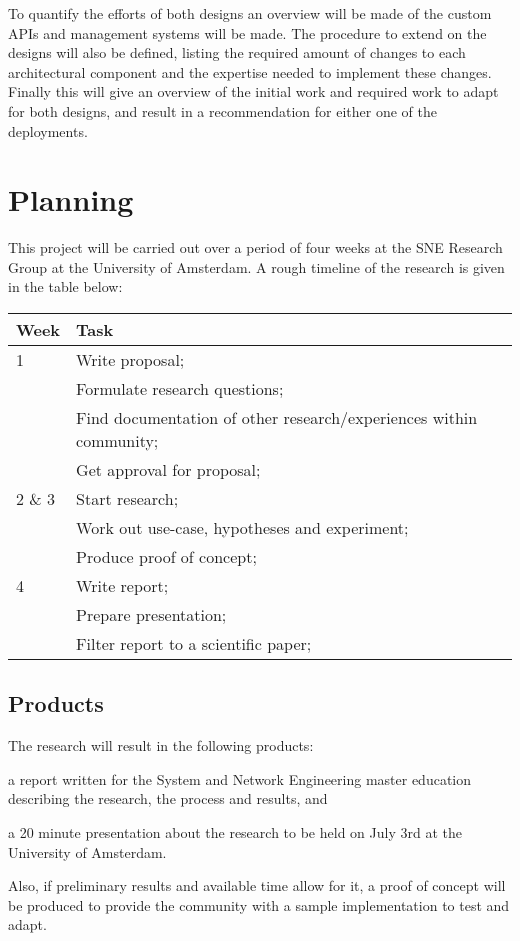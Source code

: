 \documentclass[oneside,twocolumn,8pt,a4paper]{article}
\begin{document}
		To quantify the efforts of both designs an overview will be made of the custom APIs and management systems will be made. The procedure to extend on the designs will also be defined, listing the required amount of changes to each architectural component and the expertise needed to implement these changes. Finally this will give an overview of the initial work and required work to adapt for both designs, and result in a recommendation for either one of the deployments.


	
	\section{Planning} %
	\label{sec:planning}
		This project will be carried out over a period of four weeks at the SNE Research Group at the University of Amsterdam. A rough timeline of the research is given in the table below: \\
		
		\begin{tabular}{l p{5.8cm}}
			Week & Task \\ \hline
				1 & Write proposal;\\
					& Formulate research questions; \\
					& Find documentation of other research/experiences within community; \\
					& Get approval for proposal; \\ \hline
				2 \& 3 & Start research; \\ 
					& Work out use-case, hypotheses and experiment; \\
				 	& Produce proof of concept; \\  \hline
				4 & Write report; \\ 
					& Prepare presentation; \\
					& Filter report to a scientific paper; \\
		\end{tabular}
		
		\subsection*{Products} %
		\label{sub:products}
			The research will result in the following products: 
			\begin{inparaenum}
				\item a report written for the System and Network Engineering master education describing the research, the process and results, and
				\item a 20 minute presentation about the research to be held on July 3rd at the University of Amsterdam.
			\end{inparaenum}
			Also, if preliminary results and available time allow for it, a proof of concept will be produced to provide the community with a sample implementation to test and adapt.
	
	
	
	
\end{document}
